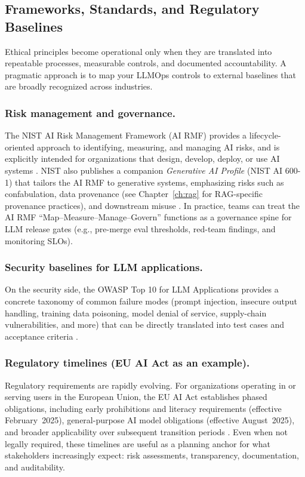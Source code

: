 \subsection{Frameworks, Standards, and Regulatory Baselines}\label{sec:ethics-frameworks}
Ethical principles become operational only when they are translated into repeatable processes, measurable controls, and
documented accountability. A pragmatic approach is to map your LLMOps controls to external baselines that are broadly
recognized across industries.

\subsubsection{Risk management and governance.}
The NIST AI Risk Management Framework (AI RMF) provides a lifecycle-oriented approach to identifying, measuring, and
managing AI risks, and is explicitly intended for organizations that design, develop, deploy, or use AI systems
\cite{nist_ai_rmf_100_1,nist_ai_rmf_site}. NIST also publishes a companion \emph{Generative AI Profile} (NIST AI 600-1)
that tailors the AI RMF to generative systems, emphasizing risks such as confabulation, data provenance (see Chapter~\ref{ch:rag} for RAG-specific provenance practices), and downstream
misuse \cite{nist_ai_600_1_genai}. In practice, teams can treat the AI RMF ``Map--Measure--Manage--Govern'' functions as
a governance spine for LLM release gates (e.g., pre-merge eval thresholds, red-team findings, and monitoring SLOs).

\subsubsection{Security baselines for LLM applications.}
On the security side, the OWASP Top 10 for LLM Applications provides a concrete taxonomy of common failure modes (prompt
injection, insecure output handling, training data poisoning, model denial of service, supply-chain vulnerabilities, and
more) that can be directly translated into test cases and acceptance criteria \cite{OWASP2024LLMTop10}.

\subsubsection{Regulatory timelines (EU AI Act as an example).}
Regulatory requirements are rapidly evolving. For organizations operating in or serving users in the European Union, the
EU AI Act establishes phased obligations, including early prohibitions and literacy requirements (effective February~2025),
general-purpose AI model obligations (effective August~2025), and broader applicability over subsequent transition periods
\cite{eu_ai_act_policy_page}. Even when not legally required, these timelines are useful as a planning anchor for what
stakeholders increasingly expect: risk assessments, transparency, documentation, and auditability.

